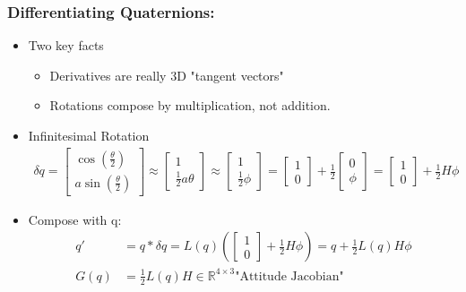 \subsubsection{Differentiating Quaternions:}
\begin{itemize}
    \item Two key facts
    \begin{itemize}
        \item Derivatives are really 3D "tangent vectors"
        \item Rotations compose by multiplication, not addition.
    \end{itemize}
    \item Infinitesimal Rotation
    \begin{align}
        \delta q = \begin{bmatrix}
            \cos(\frac{\theta}{2}) \\ a \sin(\frac{\theta}{2})
        \end{bmatrix} \approx
        \begin{bmatrix}
            1 \\ \frac{1}{2} a \theta
        \end{bmatrix} \approx
        \begin{bmatrix}
            1 \\ \frac{1}{2} \phi
        \end{bmatrix} = 
        \begin{bmatrix}
            1 \\ 0
        \end{bmatrix} + \frac{1}{2}
        \begin{bmatrix}
            0 \\ \phi
        \end{bmatrix} = 
        \begin{bmatrix}
            1 \\ 0
        \end{bmatrix} + \frac{1}{2} H \phi
    \end{align}
    \item Compose with q:
    \begin{align}
        q' & = q * \delta q = L(q) (
            \begin{bmatrix}
                1 \\ 0
            \end{bmatrix} + \frac{1}{2} H \phi
        ) = q + \frac{1}{2} L(q) H \phi \\
        G(q) & = \frac{1}{2} L(q) H \in \mathbb{R}^{4 \times 3} \text{"Attitude Jacobian"}

\end{align}
\end{itemize}
